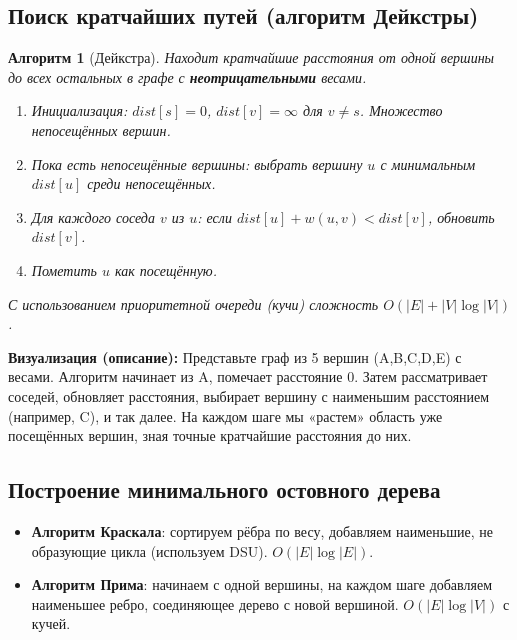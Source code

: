 \documentclass[12pt]{article}
\newtheorem{algorithm}{Алгоритм}
\begin{document}
\begin{enumerate}
\subsection{Поиск кратчайших путей (алгоритм Дейкстры)}
\begin{algorithm}[Дейкстра]
    Находит кратчайшие расстояния от одной вершины до всех остальных в графе с \textbf{неотрицательными} весами.
    \begin{enumerate}
        \item Инициализация: \(dist[s] = 0\), \(dist[v] = \infty\) для \(v \neq s\). Множество непосещённых вершин.
        \item Пока есть непосещённые вершины: выбрать вершину \(u\) с минимальным \(dist[u]\) среди непосещённых.
        \item Для каждого соседа \(v\) из \(u\): если \(dist[u] + w(u,v) < dist[v]\), обновить \(dist[v]\).
        \item Пометить \(u\) как посещённую.
    \end{enumerate}
    С использованием приоритетной очереди (кучи) сложность \(O(|E| + |V|\log|V|)\).
\end{algorithm}
\textbf{Визуализация (описание):} Представьте граф из 5 вершин (A,B,C,D,E) с весами. Алгоритм начинает из A, помечает расстояние 0. Затем рассматривает соседей, обновляет расстояния, выбирает вершину с наименьшим расстоянием (например, C), и так далее. На каждом шаге мы «растем» область уже посещённых вершин, зная точные кратчайшие расстояния до них.

\subsection{Построение минимального остовного дерева}
\begin{itemize}
    \item \textbf{Алгоритм Краскала}: сортируем рёбра по весу, добавляем наименьшие, не образующие цикла (используем DSU). \(O(|E|\log|E|)\).
    \item \textbf{Алгоритм Прима}: начинаем с одной вершины, на каждом шаге добавляем наименьшее ребро, соединяющее дерево с новой вершиной. \(O(|E|\log|V|)\) с кучей.
\end{itemize}


\end{enumerate}
\end{document}
